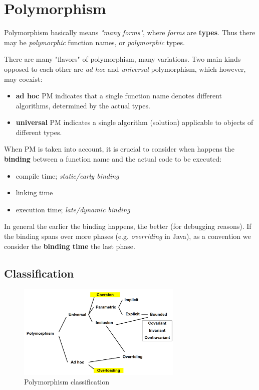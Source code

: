 \chapter{Polymorphism}
Polymorphism basically means \textit{"many forms"}, where \textit{forms} are \textbf{types}.
Thus there may be \textit{polymorphic} function names, or \textit{polymorphic} types.

There are many "flavors" of polymorphism, many variations.
Two main kinds opposed to each other are \textit{ad hoc} and \textit{universal} polymorphism, which however, may coexist:
\begin{itemize}
    \item \textbf{ad hoc} PM indicates that a single function name denotes different algorithms, determined by the actual types.
    \item \textbf{universal} PM indicates a single algorithm (solution) applicable to objects of different types.
\end{itemize}

When PM is taken into account, it is crucial to consider when happens the \textbf{binding} between a function name and the actual code to be executed:
\begin{itemize}
    \item compile time; \textit{static/early binding}
    \item linking time
    \item execution time; \textit{late/dynamic binding}
\end{itemize}
In general the earlier the binding happens, the better (for debugging reasons).
If the binding spans over more phases (e.g. \textit{overriding} in Java), as a convention we consider the \textbf{binding time} the last phase.

\section{Classification}
\begin{figure}[h]
    \centering
    \includegraphics[width=0.7\textwidth]{images/polymorphism.png}
    \caption{Polymorphism classification}
    \label{fig:polymorphism_classification}
\end{figure}
